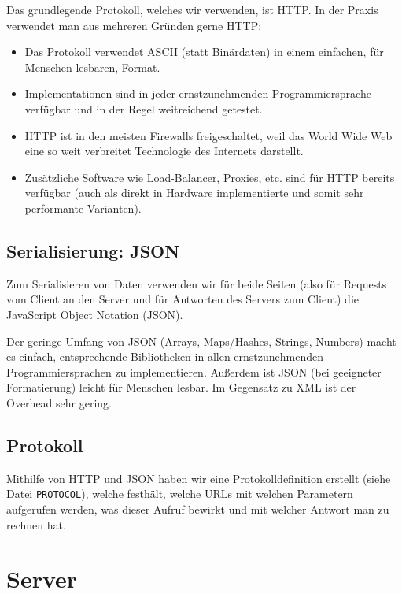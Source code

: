 \documentclass[12pt, a4paper]{scrartcl}
\begin{document}
Das grundlegende Protokoll, welches wir verwenden, ist HTTP. In der Praxis
verwendet man aus mehreren Gründen gerne HTTP:
\begin{itemize}
	\item Das Protokoll verwendet ASCII (statt Binärdaten) in einem
	einfachen, für Menschen lesbaren, Format.

	\item Implementationen sind in jeder ernstzunehmenden
	Programmiersprache ver\-füg\-bar und in der Regel weitreichend getestet.

	\item HTTP ist in den meisten Firewalls freigeschaltet, weil das World
	Wide Web eine so weit verbreitet Technologie des Internets darstellt.

	\item Zusätzliche Software wie Load-Balancer, Proxies, etc. sind für
	HTTP bereits verfügbar (auch als direkt in Hardware implementierte und
	somit sehr performante Varianten).
\end{itemize}

\subsection{Serialisierung: JSON}

Zum Serialisieren von Daten verwenden wir für beide Seiten (also für Requests
vom Client an den Server und für Antworten des Servers zum Client) die
JavaScript Object Notation (JSON).
\np

Der geringe Umfang von JSON (Arrays, Maps/Hashes, Strings, Numbers) macht es
einfach, entsprechende Bibliotheken in allen ernstzunehmenden
Programmiersprachen zu implementieren. Außerdem ist JSON (bei geeigneter
Formatierung) leicht für Menschen lesbar. Im Gegensatz zu XML ist der Overhead
sehr gering.

\subsection{Protokoll}

Mithilfe von HTTP und JSON haben wir eine Protokolldefinition erstellt (siehe
Datei \texttt{PROTOCOL}), welche festhält, welche URLs mit welchen Parametern
aufgerufen werden, was dieser Aufruf bewirkt und mit welcher Antwort man zu
rechnen hat.

\clearpage

\section{Server}
\end{document}
